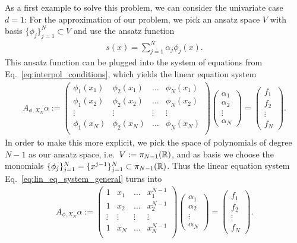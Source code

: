 As a first example to solve this problem, we can consider the univariate case $d=1$:
For the approximation of our problem, we pick an ansatz space $V$ with basis $\{ \phi_j \}_{j=1}^N \subset V$ and use the ansatz function
\begin{align*}
s(x) = \sum_{j=1}^N \alpha_j \phi_j(x).
\end{align*}
This ansatz function can be plugged into the system of equations from Eq.~\eqref{eq:interpol_conditions}, 
which yields the linear equation system
\begin{align}
\label{eq:lin_eq_system_general}
A_{\phi, X_N} \alpha := 
\begin{pmatrix}
\phi_1(x_1) & \phi_2(x_1) & \dots & \phi_N(x_1) \\
\phi_1(x_2) & \phi_2(x_2) & \dots & \phi_N(x_2) \\
\vdots & \vdots & \vdots & \vdots \\
\phi_1(x_N) & \phi_2(x_N) & \dots & \phi_N(x_N) \\
\end{pmatrix}
\begin{pmatrix}
\alpha_1 \\ \alpha_2 \\ \vdots \\ \alpha_N
\end{pmatrix}
=
\begin{pmatrix}
f_1 \\ f_2 \\ \vdots \\ f_N
\end{pmatrix}.
\end{align}
In order to make this more explicit, we pick the space of polynomials of degree $N-1$ as our ansatz space, 
i.e.\ $V := \pi_{N-1}(\mathbb{R})$,
and as basis we choose the monomials $\{ \phi_j \}_{j=1}^N = \{ x^{j-1} \}_{j=1}^N \subset \pi_{N-1}(\mathbb{R})$.
Thus the linear equation system Eq.~\eqref{eq:lin_eq_system_general} turns into
\begin{align*}
A_{\phi, X_N} \alpha := 
\begin{pmatrix}
1 & x_1 & \dots & x_1^{N-1} \\
1 & x_2 & \dots & x_2^{N-1} \\
\vdots & \vdots & \vdots & \vdots \\
1 & x_N & \dots & x_N^{N-1} \\
\end{pmatrix}
\begin{pmatrix}
\alpha_1 \\ \alpha_2 \\ \vdots \\ \alpha_N
\end{pmatrix}
=
\begin{pmatrix}
f_1 \\ f_2 \\ \vdots \\ f_N
\end{pmatrix}.
\end{align*}
